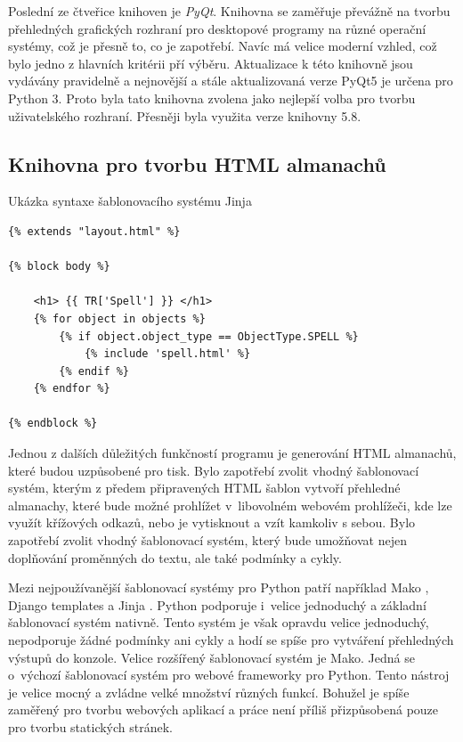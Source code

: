 \documentclass[thesis=B,czech]{resources/FITthesis}[2012/06/26]
\begin{document}
Poslední ze čtveřice knihoven je \textit{PyQt}. Knihovna se zaměřuje převážně na tvorbu přehledných grafických rozhraní pro desktopové programy na různé operační systémy, což je přesně to, co je zapotřebí. Navíc má velice moderní vzhled, což bylo jedno z hlavních kritérii pří výběru. Aktualizace k této knihovně jsou vydávány pravidelně a nejnovější a stále aktualizovaná verze PyQt5 je určena pro Python 3. Proto byla tato knihovna zvolena jako nejlepší volba pro tvorbu uživatelského rozhraní. Přesněji byla využita verze knihovny 5.8.
\subsection{Knihovna pro tvorbu HTML almanachů}
\begin{listing}[htbp]
\caption{\label{code:jinja}Ukázka syntaxe šablonovacího systému Jinja}
\begin{verbatim}
{% extends "layout.html" %}

{% block body %}

    <h1> {{ TR['Spell'] }} </h1>
    {% for object in objects %}
        {% if object.object_type == ObjectType.SPELL %}
            {% include 'spell.html' %}
        {% endif %}
    {% endfor %}
    
{% endblock %}

\end{verbatim}
\end{listing}
Jednou z dalších důležitých funkčností programu je generování HTML almanachů, které budou uzpůsobené pro tisk. Bylo zapotřebí zvolit vhodný šablonovací systém, kterým z předem připravených HTML šablon vytvoří přehledné almanachy, které bude možné prohlížet v~libovolném webovém prohlížeči, kde lze využít křížových odkazů, nebo je vytisknout a vzít kamkoliv s sebou. Bylo zapotřebí zvolit vhodný šablonovací systém, který bude umožňovat nejen doplňování proměnných do textu, ale také podmínky a cykly.\par

Mezi nejpoužívanější šablonovací systémy pro Python patří například Mako \cite{mako}, Django templates a Jinja \cite{jinja}. Python podporuje i~velice jednoduchý a základní šablonovací systém nativně. Tento systém je však opravdu velice jednoduchý, nepodporuje žádné podmínky ani cykly a hodí se spíše pro vytváření přehledných výstupů do konzole. Velice rozšířený šablonovací systém je Mako. Jedná se o~výchozí šablonovací systém pro webové frameworky pro Python. Tento nástroj je velice mocný a zvládne velké množství různých funkcí. Bohužel je spíše zaměřený pro tvorbu webových aplikací a práce není příliš přizpůsobená pouze pro tvorbu statických stránek.\par
\end{document}
